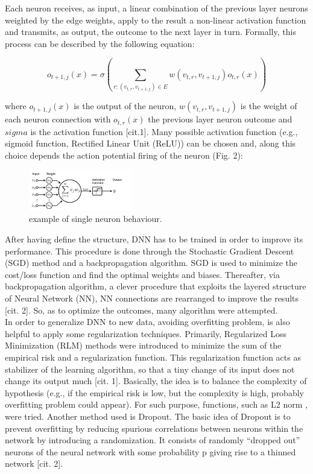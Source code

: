 \documentclass[prl,twocolumn]{revtex4-1}
\begin{document}
Each neuron receives, as input, a linear combination of the previous layer neurons weighted by the edge weights, apply to the result a non-linear activation function and transmits, as output, the outcome to the next layer in turn. Formally, this process can be described by the following equation:

\begin{equation}
o_{t+1,j}(x) = \sigma \left(\sum_{r:(v_{t,r}, v_{t+1,j}) \in E}w(v_{t,r}, v_{t+1,j})o_{t,r}(x)\right)
\label{eq:simple}
\end{equation}

where \(o_{t+1,j}(x)\) is the output of the neuron, \(w(v_{t,r}, v_{t+1,j})\) is the weight of each neuron connection with \(o_{t,r}(x)\) the previous layer neuron outcome and \(sigma\) is the activation function [cit.1]. Many possible activation function (e.g., sigmoid function, Rectified Linear Unit (ReLU)) can be chosen and, along this choice depends the action potential firing of the neuron (Fig. 2):

\begin{figure}[h]
	\includegraphics[width=0.40\textwidth]{Activation.png}
	\caption{example of single neuron behaviour.}
	\label{fig:y}
\end{figure}

After having define the structure, DNN has to be trained in order to improve its performance.  This procedure is done through the Stochastic Gradient Descent (SGD) method and a backpropagation algorithm. SGD is used to minimize the cost/loss function and find the optimal weights and biases. Thereafter, via backpropagation algorithm, a clever procedure that exploits the layered structure of Neural Network (NN), NN connections are rearranged to improve the results [cit. 2]. So, as to optimize the outcomes, many algorithm were attempted. \\
In order to generalize DNN to new data, avoiding overfitting problem, is also helpful to apply some regularization techniques. Primarily, Regularized Loss Minimization (RLM) methods were introduced to minimize the sum of the empirical risk and a regularization function. This regularization function acts as stabilizer of the learning algorithm, so that a tiny change of its input does not change its output much [cit. 1]. Basically, the idea is to balance the complexity of hypothesis (e.g., if the empirical risk is low, but the complexity is high, probably overfitting problem could appear). For such purpose, functions, such as L2 norm , were tried. Another method used is Dropout. The basic idea of Dropout is to prevent overfitting by reducing spurious correlations between neurons within the network by introducing a randomization. It consists of randomly “dropped out” neurons of the neural network with some probability p giving rise to a thinned network [cit. 2]. \\
\end{document}
